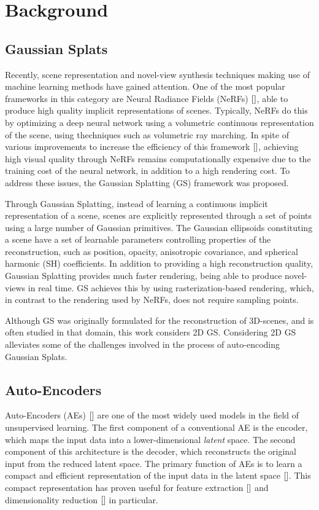 \section{Background}
\label{sec:background}

\subsection{Gaussian Splats}
\label{bg-gs}
Recently, scene representation and novel-view synthesis techniques making use of machine learning methods have gained attention. One of the most popular frameworks in this category are Neural Radiance Fields (NeRFs) $\cite{}{}$, able to produce high quality implicit representations of scenes. Typically, NeRFs do this by optimizing a deep neural network using a volumetric continuous representation of the scene, using thechniques such as volumetric ray marching. In spite of various improvements to increase the efficiency of this framework $\cite{}{}$, achieving high visual quality through NeRFs remains computationally expensive due to the training cost of the neural network, in addition to a high rendering cost. To address these issues, the Gaussian Splatting (GS) framework was proposed.

Through Gaussian Splatting, instead of learning a continuous implicit representation of a scene, scenes are explicitly represented through a set of points using a large number of Gaussian primitives. The Gaussian ellipsoids constituting a scene have a set of learnable parameters controlling properties of the reconstruction, such as position, opacity, anisotropic covariance, and spherical harmonic (SH) coefficients. In addition to providing a high reconstruction quality, Gaussian Splatting provides much faster rendering, being able to produce novel-views in real time. GS achieves this by using rasterization-based rendering, which, in contrast to the rendering used by NeRFs, does not require sampling points.

Although GS was originally formulated for the reconstruction of 3D-scenes, and is often studied in that domain, this work considers 2D GS. Considering 2D GS alleviates some of the challenges involved in the process of auto-encoding Gaussian Splats.

\subsection{Auto-Encoders}
\label{bg-ae}
Auto-Encoders (AEs) $\cite{}$ are one of the most widely used models in the field of unsupervised learning. The first component of a conventional AE is the encoder, which maps the input data into a lower-dimensional \textit{latent} space. The second component of this architecture is the decoder, which reconstructs the original input from the reduced latent space. The primary function of AEs is to learn a compact and efficient representation of the input data in the latent space $\cite{}$. This compact representation has proven useful for feature extraction $\cite{}$ and dimensionality reduction $\cite{}$ in particular.

